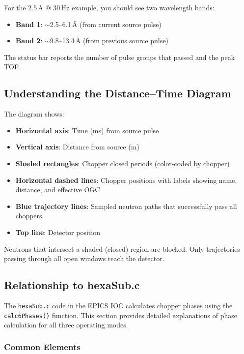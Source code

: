 \documentclass[tm]{ornltm}
\begin{document}
For the 2.5\,\AA{} @ 30\,Hz example, you should see two wavelength bands:
\begin{itemize}
    \item \textbf{Band 1}: $\sim$2.5--6.1\,\AA{} (from current source pulse)
    \item \textbf{Band 2}: $\sim$9.8--13.4\,\AA{} (from previous source pulse)
\end{itemize}

The status bar reports the number of pulse groups that passed and the peak TOF.

\subsection{Understanding the Distance--Time Diagram}

The diagram shows:
\begin{itemize}
    \item \textbf{Horizontal axis}: Time (ms) from source pulse
    \item \textbf{Vertical axis}: Distance from source (m)
    \item \textbf{Shaded rectangles}: Chopper closed periods (color-coded by chopper)
    \item \textbf{Horizontal dashed lines}: Chopper positions with labels showing name, distance, and effective OGC
    \item \textbf{Blue trajectory lines}: Sampled neutron paths that successfully pass all choppers
    \item \textbf{Top line}: Detector position
\end{itemize}

Neutrons that intersect a shaded (closed) region are blocked. Only trajectories passing through all open windows reach the detector.

\subsection{Relationship to hexaSub.c}

The \texttt{hexaSub.c} code in the EPICS IOC calculates chopper phases using the \texttt{calc6Phases()} function. This section provides detailed explanations of phase calculation for all three operating modes.

\subsubsection{Common Elements}
\end{document}
